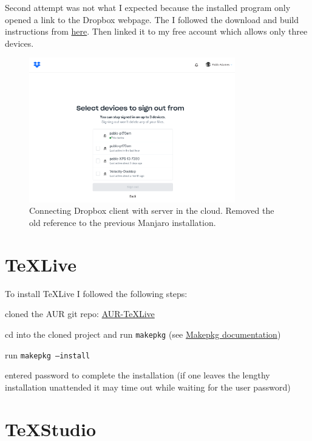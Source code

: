 \documentclass[]{scrartcl}
\begin{document}
	Second attempt was not what I expected because the installed program only opened a link to the Dropbox webpage.
	The I followed the download and build instructions from \href{https://help.dropbox.com/installs-integrations/desktop/linux-commands}{here}. 
	Then linked it to my free account which allows only three devices.
	
	\begin{figure}[!htb]
		\centering
		\caption{Connecting Dropbox client with server in the cloud. Removed the old reference to the previous Manjaro installation.}
		\includegraphics[width=0.8\textwidth]{Images/DropBoxSetUp.png}
	\end{figure}
	
\section{\TeX{}Live}

To install \TeX{}Live I followed the following steps:

\begin{compactenum}
	\item cloned the AUR git repo: \href{https://aur.archlinux.org/packages/texlive-full}{AUR-TeXLive}
	\item cd into the cloned project and run \texttt{makepkg} (see \href{https://wiki.archlinux.org/title/Makepkg}{Makepkg documentation})
	\item run \texttt{makepkg --install}
	\item entered password to complete the installation (if one leaves the lengthy installation unattended it may time out while waiting for the user password)
\end{compactenum}


\section{\TeX{}Studio}
\end{document}
